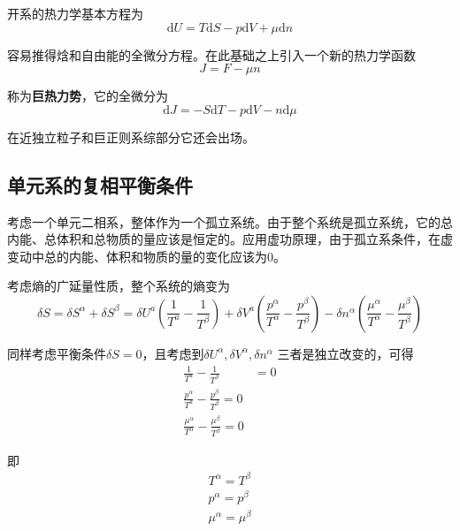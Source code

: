 \documentclass[UTF8]{ctexart}
\begin{document}
	开系的热力学基本方程为
	\begin{equation}
	\mathrm{d} U=T \mathrm{d} S-p \mathrm{d} V+\mu \mathrm{d} n
	\end{equation}
	
\noindent 容易推得焓和自由能的全微分方程。在此基础之上引入一个新的热力学函数
\begin{equation}
J=F-\mu n
\end{equation}

\noindent 称为\textbf{巨热力势}，它的全微分为
\begin{equation}
\mathrm{d} J=-S \mathrm{d} T-p \mathrm{d} V-n \mathrm{d} \mu
\end{equation}

\noindent 在近独立粒子和巨正则系综部分它还会出场。

	\subsection{单元系的复相平衡条件}
	考虑一个单元二相系，整体作为一个孤立系统。由于整个系统是孤立系统，它的总内能、总体积和总物质的量应该是恒定的。应用虚功原理，由于孤立系条件，在虚变动中总的内能、体积和物质的量的变化应该为0。
	
	考虑熵的广延量性质，整个系统的熵变为
	\begin{equation}
	\delta S=\delta S^{\alpha}+\delta S^{\beta}=\delta U^{a}\left(\frac{1}{T^{a}}-\frac{1}{T^{\beta}}\right)+\delta V^{a}\left(\frac{p^{\alpha}}{T^{\alpha}}-\frac{p^{\beta}}{T^{\beta}}\right)-\delta n^{\alpha}\left(\frac{\mu^{\alpha}}{T^{\alpha}}-\frac{\mu^{\beta}}{T^{\beta}}\right)
	\end{equation}
	
\noindent 同样考虑平衡条件$ \delta S = 0 $，且考虑到$ \delta U^{\alpha}, \delta V^{\alpha}, \delta n^{\alpha} $ 三者是独立改变的，可得
\begin{equation}
	\begin{aligned}
	\frac{1}{T^{a}}-\frac{1}{T^{\beta}}&=0
	\\
	\frac{p^{ \alpha}}{T^{a}}-\frac{p^{\beta}}{T^{\beta}}=0
	\\
	\frac{\mu^{\alpha}}{T^{\alpha}}-\frac{\mu^{\beta}}{T^{\beta}}=0
	\end{aligned}
\end{equation}

\noindent 即
\begin{equation}
\begin{array}{l}{T^{\alpha}=T^{\beta}} \\ {p^{\alpha}=p^{\beta}} \\ {\mu^{\alpha}=\mu^{\beta}}\end{array}
\end{equation}
\end{document}
